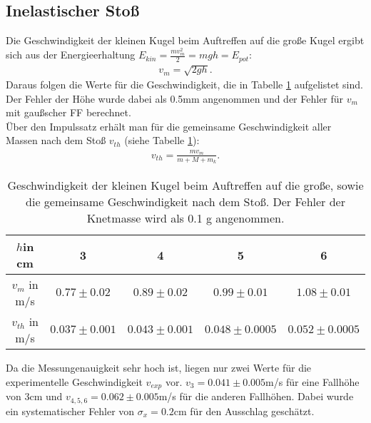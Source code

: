 \documentclass[oneside]{article}
\begin{document}
\subsection*{Inelastischer Stoß}
Die Geschwindigkeit der kleinen Kugel beim Auftreffen auf die große Kugel ergibt sich aus der Energieerhaltung $E_{kin}=\frac{mv_{m}^{2}}{2}=mgh=E_{pot}$:\\
\begin{align*}
v_{m}=\sqrt{2gh}.
\end{align*}
Daraus folgen die Werte für die Geschwindigkeit, die in Tabelle \ref{vm} aufgelistet sind. Der Fehler der Höhe wurde dabei als 0.5\;mm angenommen und der Fehler für $v_{m}$ mit gaußscher FF berechnet.\\
Über den Impulssatz erhält man für die gemeinsame Geschwindigkeit aller Massen nach dem Stoß $v_{th}$ (siehe Tabelle \ref{vm}):
\begin{align*}
v_{th}=\frac{mv_{m}}{m+M+m_{k}}.
\end{align*}
\begin{table}
\begin{center}
\begin{tabular}{|c|c|c|c|c|}
$h$in cm&3&4&5&6\\
\hline
$v_{m}$ in m/s&$0.77\pm 0.02$&$0.89\pm 0.02$&$0.99\pm 0.01$&$1.08\pm 0.01$\\
\hline
$v_{th}$ in m/s& $0.037\pm 0.001$&$0.043\pm 0.001 $ &$0.048\pm 0.0005$ &$0.052\pm 0.0005 $ \\
\hline
\end{tabular}
\end{center}
\caption{Geschwindigkeit der kleinen Kugel beim Auftreffen auf die große, sowie die gemeinsame Geschwindigkeit nach dem Stoß. Der Fehler der Knetmasse wird als 0.1 g angenommen.\label{vm}}
\end{table}
Da die Messungenauigkeit sehr hoch ist, liegen nur zwei Werte für die experimentelle Geschwindigkeit $v_{exp}$ vor. $v_{3}=0.041 \pm 0.005$\;m/s für eine Fallhöhe von 3\;cm und $v_{4,5,6}=0.062\pm 0.005 $\;m/s für die anderen Fallhöhen. Dabei wurde ein systematischer Fehler von $\sigma_{x}=0.2$\;cm für den Ausschlag geschätzt.
\end{document}
